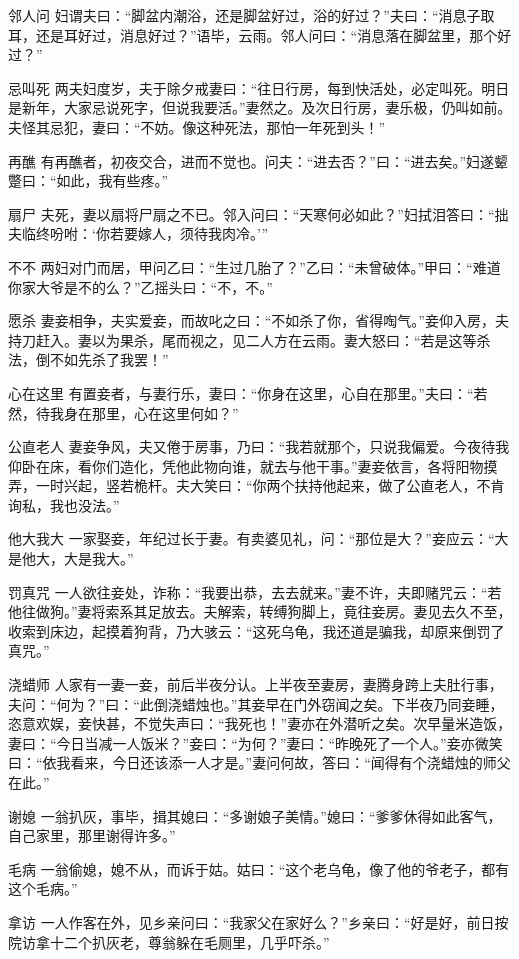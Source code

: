 \documentclass[12pt,UTF8]{ctexbook}
\begin{document}
邻人问
妇谓夫曰：“脚盆内潮浴，还是脚盆好过，浴的好过？”夫曰：“消息子取耳，还是耳好过，消息好过？”语毕，云雨。邻人问曰：“消息落在脚盆里，那个好过？”

忌叫死
两夫妇度岁，夫于除夕戒妻曰：“往日行房，每到快活处，必定叫死。明日是新年，大家忌说死字，但说我要活。”妻然之。及次日行房，妻乐极，仍叫如前。夫怪其忌犯，妻曰：“不妨。像这种死法，那怕一年死到头！”

再醮
有再醮者，初夜交合，进而不觉也。问夫：“进去否？”曰：“进去矣。”妇遂颦蹩曰：“如此，我有些疼。”

扇尸
夫死，妻以扇将尸扇之不已。邻入问曰：“天寒何必如此？”妇拭泪答曰：“拙夫临终吩咐：‘你若要嫁人，须待我肉冷。’”

不不
两妇对门而居，甲问乙曰：“生过几胎了？”乙曰：“未曾破体。”甲曰：“难道你家大爷是不的么？”乙摇头曰：“不，不。”

愿杀
妻妾相争，夫实爱妾，而故叱之曰：“不如杀了你，省得啕气。”妾仰入房，夫持刀赶入。妻以为果杀，尾而视之，见二人方在云雨。妻大怒曰：“若是这等杀法，倒不如先杀了我罢！”

心在这里
有置妾者，与妻行乐，妻曰：“你身在这里，心自在那里。”夫曰：“若然，待我身在那里，心在这里何如？”

公直老人
妻妾争风，夫又倦于房事，乃曰：“我若就那个，只说我偏爱。今夜待我仰卧在床，看你们造化，凭他此物向谁，就去与他干事。”妻妾依言，各将阳物摸弄，一时兴起，竖若桅杆。夫大笑曰：“你两个扶持他起来，做了公直老人，不肯询私，我也没法。”

他大我大
一家娶妾，年纪过长于妻。有卖婆见礼，问：“那位是大？”妾应云：“大是他大，大是我大。”

罚真咒
一人欲往妾处，诈称：“我要出恭，去去就来。”妻不许，夫即赌咒云：“若他往做狗。”妻将索系其足放去。夫解索，转缚狗脚上，竟往妾房。妻见去久不至，收索到床边，起摸着狗背，乃大骇云：“这死乌龟，我还道是骗我，却原来倒罚了真咒。”

浇蜡师
人家有一妻一妾，前后半夜分认。上半夜至妻房，妻腾身跨上夫肚行事，夫问：“何为？”曰：“此倒浇蜡烛也。”其妾早在门外窃闻之矣。下半夜乃同妾睡，恣意欢娱，妾快甚，不觉失声曰：“我死也！”妻亦在外潜听之矣。次早量米造饭，妻曰：“今日当减一人饭米？”妾曰：“为何？”妻曰：“昨晚死了一个人。”妾亦微笑曰：“依我看来，今日还该添一人才是。”妻问何故，答曰：“闻得有个浇蜡烛的师父在此。”

谢媳
一翁扒灰，事毕，揖其媳曰：“多谢娘子美情。”媳曰：“爹爹休得如此客气，自己家里，那里谢得许多。”

毛病
一翁偷媳，媳不从，而诉于姑。姑曰：“这个老乌龟，像了他的爷老子，都有这个毛病。”

拿访
一人作客在外，见乡亲问曰：“我家父在家好么？”乡亲曰：“好是好，前日按院访拿十二个扒灰老，尊翁躲在毛厕里，几乎吓杀。”
\end{document}
